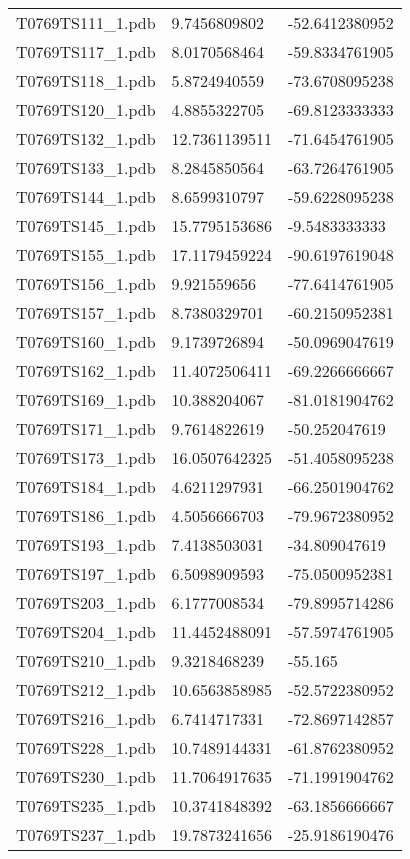 \begin{longtable}{lll}
T0769TS111\_1.pdb & 9.7456809802 & -52.6412380952\\
T0769TS117\_1.pdb & 8.0170568464 & -59.8334761905\\
T0769TS118\_1.pdb & 5.8724940559 & -73.6708095238\\
T0769TS120\_1.pdb & 4.8855322705 & -69.8123333333\\
T0769TS132\_1.pdb & 12.7361139511 & -71.6454761905\\
T0769TS133\_1.pdb & 8.2845850564 & -63.7264761905\\
T0769TS144\_1.pdb & 8.6599310797 & -59.6228095238\\
T0769TS145\_1.pdb & 15.7795153686 & -9.5483333333\\
T0769TS155\_1.pdb & 17.1179459224 & -90.6197619048\\
T0769TS156\_1.pdb & 9.921559656 & -77.6414761905\\
T0769TS157\_1.pdb & 8.7380329701 & -60.2150952381\\
T0769TS160\_1.pdb & 9.1739726894 & -50.0969047619\\
T0769TS162\_1.pdb & 11.4072506411 & -69.2266666667\\
T0769TS169\_1.pdb & 10.388204067 & -81.0181904762\\
T0769TS171\_1.pdb & 9.7614822619 & -50.252047619\\
T0769TS173\_1.pdb & 16.0507642325 & -51.4058095238\\
T0769TS184\_1.pdb & 4.6211297931 & -66.2501904762\\
T0769TS186\_1.pdb & 4.5056666703 & -79.9672380952\\
T0769TS193\_1.pdb & 7.4138503031 & -34.809047619\\
T0769TS197\_1.pdb & 6.5098909593 & -75.0500952381\\
T0769TS203\_1.pdb & 6.1777008534 & -79.8995714286\\
T0769TS204\_1.pdb & 11.4452488091 & -57.5974761905\\
T0769TS210\_1.pdb & 9.3218468239 & -55.165\\
T0769TS212\_1.pdb & 10.6563858985 & -52.5722380952\\
T0769TS216\_1.pdb & 6.7414717331 & -72.8697142857\\
T0769TS228\_1.pdb & 10.7489144331 & -61.8762380952\\
T0769TS230\_1.pdb & 11.7064917635 & -71.1991904762\\
T0769TS235\_1.pdb & 10.3741848392 & -63.1856666667\\
T0769TS237\_1.pdb & 19.7873241656 & -25.9186190476\\

\end{longtable}
